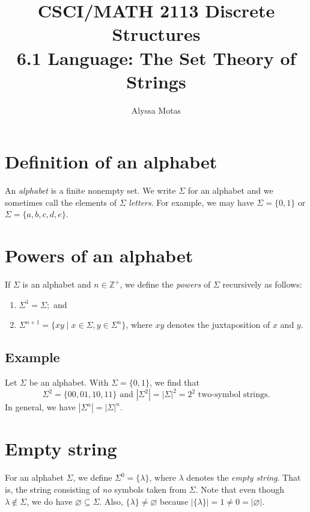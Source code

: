 \documentclass[11pt]{article}
\title{\textbf{CSCI/MATH 2113 Discrete Structures} \\ 6.1 Language: The Set Theory of Strings}
\author{Alyssa Motas}
\let\emptyset\varnothing
\begin{document}
    \maketitle

    \pagebreak

    \tableofcontents

    \pagebreak

    \section{Definition of an alphabet}

    An \emph{alphabet} is a finite nonempty set. We write \(\Sigma\) for an alphabet and we sometimes call the elements of \(\Sigma\) \emph{letters}. For example, we may have \(\Sigma = \{0,1\}\) or \(\Sigma = \{a,b,c,d,e\}\).

    \section{Powers of an alphabet}

    If \(\Sigma\) is an alphabet and \(n \in \mathbb{Z}^+\), we define the \emph{powers} of \(\Sigma\) recursively as follows:
    \begin{enumerate}
        \item \(\Sigma^1 = \Sigma;\) and 
        \item \(\Sigma^{n+1} = \{xy \mid x \in \Sigma, y \in \Sigma^n\}\), where $xy$ denotes the juxtaposition of $x$ and $y$.
    \end{enumerate} 

    \subsection{Example}

    Let \(\Sigma\) be an alphabet. With \(\Sigma = \{0,1\}\), we find that \[\Sigma^2 = \{00, 01, 10, 11\} \text{ and } |\Sigma^2| = |\Sigma|^2 = 2^2 \text{ two-symbol strings}.\] In general, we have \(|\Sigma^n| = |\Sigma|^n\).

    \section{Empty string}

    For an alphabet \(\Sigma\), we define \(\Sigma^0 = \{\lambda\}\), where \(\lambda\) denotes the \emph{empty string}. That is, the string consisting of \emph{no} symbols taken from \(\Sigma\). Note that even though \(\lambda \notin \Sigma\), we do have \(\emptyset \subseteq \Sigma\). Also, \(\{\lambda\} \neq \emptyset\) because \(|\{\lambda\}| = 1 \neq 0 = |\emptyset|\).
\end{document}
